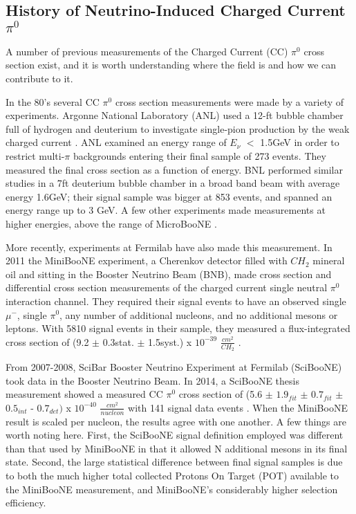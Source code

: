 \documentclass[12pt]{article}
\begin{document}
\subsection{History of Neutrino-Induced Charged Current $\pi^0$}
 A number of previous measurements of the Charged Current (CC) $\pi^0$ cross section exist, and it is worth understanding where the field is and how we can contribute to it.  
\par In the 80's several CC $\pi^0$ cross section measurements were made by a variety of experiments.  Argonne National Laboratory (ANL) used a 12-ft bubble chamber full of hydrogen and deuterium to investigate single-pion production by the weak charged current \cite{bib:ANL1} \cite{bib:ANL2}. ANL examined an energy range of $E_\nu$ $<$ 1.5GeV in order to restrict multi-$\pi$ backgrounds entering their final sample of 273 events. They measured the final cross section as a function of energy. BNL performed similar studies in a 7ft deuterium bubble chamber in a broad band beam with average energy 1.6GeV; their signal sample was bigger at 853 events, and spanned an energy range up to 3 GeV. A few other experiments made measurements at higher energies, above the range of MicroBooNE \cite{bib:HE_unknown1} \cite{bib:HE_unknown2}.
\par More recently, experiments at Fermilab have also made this measurement. In 2011 the MiniBooNE experiment, a Cherenkov detector filled with $CH_2$ mineral oil and sitting in the Booster Neutrino Beam (BNB), made cross section and differential cross section measurements of the charged current single neutral $\pi^0$ interaction channel. They required their signal events to have an observed single $\mu^-$, single $\pi^0$, any number of additional nucleons, and no additional mesons or leptons. With 5810 signal events in their sample, they measured a flux-integrated cross section of (9.2 $\pm$ 0.3stat. $\pm$ 1.5syst.) x $10^{-39}$ $\frac{cm^2}{CH_2}$ \cite{bib:numucc_miniboone} \cite{bib:miniboone_thesis}. 
\par From 2007-2008, SciBar Booster Neutrino Experiment at Fermilab (SciBooNE) took data in the Booster Neutrino Beam.  In 2014, a SciBooNE thesis measurement showed a measured CC $\pi^0$ cross section of (5.6 $\pm$ $1.9_{fit}$ $\pm$ $0.7_{fit}$ $\pm$ $0.5_{int}$ - $0.7_{det})$ x $10^{-40}$ $\frac{cm^2}{nucleon}$ with 141 signal data events \cite{bib:sciboone_thesis}. When the MiniBooNE result is scaled per nucleon, the results agree with one another. A few things are worth noting here. First, the SciBooNE signal definition employed was different than that used by MiniBooNE in that it allowed N additional mesons in its final state. Second, the large statistical difference between final signal samples is due to both the much higher total collected Protons On Target (POT) available to the MiniBooNE measurement, and MiniBooNE's considerably higher selection efficiency. %
\end{document}
